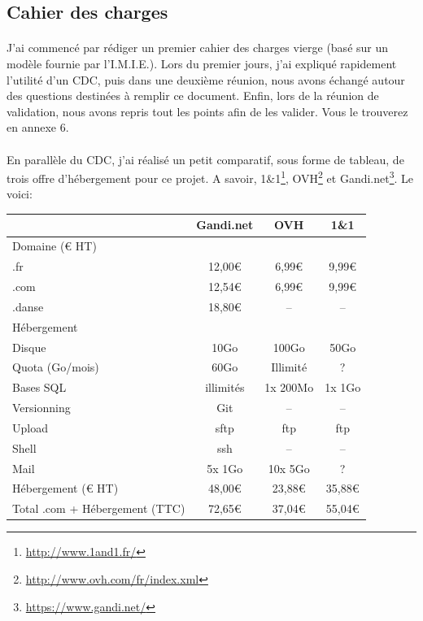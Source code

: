 \documentclass[11pt,a4paper,twoside]{report}
\begin{document}
		\subsection{Cahier des charges}
			\paragraph*{}J'ai commencé par rédiger un premier cahier des charges vierge (basé sur un modèle fournie par l'I.M.I.E.). Lors du premier jours, j'ai expliqué rapidement l'utilité d'un CDC, puis dans une deuxième réunion, nous avons échangé autour des questions destinées à remplir ce document. Enfin, lors de la réunion de validation, nous avons repris tout les points afin de les valider. Vous le trouverez en annexe 6.
			\paragraph*{}En parallèle du CDC, j'ai réalisé un petit comparatif, sous forme de tableau, de trois offre d'hébergement pour ce projet. A savoir, 1\&1\footnote{\url{http://www.1and1.fr/}}, OVH\footnote{\url{http://www.ovh.com/fr/index.xml}} et Gandi.net\footnote{\url{https://www.gandi.net/}}. Le voici:\\

				\begin{center}
					\begin{tabular}{|l|c|c|c|}
						\hline  & Gandi.net & OVH & 1\&1 \\ 
						\hline Domaine (\euro{} HT)\cellcolor[gray]{0.9} & \cellcolor[gray]{0.9} & \cellcolor[gray]{0.9} & \cellcolor[gray]{0.9} \\ 
						.fr & 12,00\euro{} & 6,99\euro{} & 9,99\euro{} \\ 
						.com & 12,54\euro{} & 6,99\euro{} & 9,99\euro{} \\ 
						.danse & 18,80\euro{} & -- & -- \\ 
						\hline Hébergement\cellcolor[gray]{0.9} & \cellcolor[gray]{0.9} & \cellcolor[gray]{0.9} & \cellcolor[gray]{0.9} \\ 
						Disque & 10Go & 100Go & 50Go \\ 
						Quota (Go/mois) & 60Go & Illimité & ? \\ 
						Bases SQL & illimités & 1x 200Mo & 1x 1Go \\
						Versionning  & Git & -- & -- \\ 
						Upload & sftp & ftp & ftp \\ 
						Shell & ssh & -- & -- \\ 
						Mail & 5x 1Go & 10x 5Go & ? \\ 
						Hébergement (\euro{} HT)\cellcolor[gray]{0.9} & 48,00\euro{}\cellcolor[gray]{0.9} & 23,88\euro{}\cellcolor[gray]{0.9} & 35,88\euro{}\cellcolor[gray]{0.9} \\ 
						Total .com + Hébergement (TTC)\cellcolor[gray]{0.7} & 72,65\euro{}\cellcolor[gray]{0.7} & 37,04\euro{}\cellcolor[gray]{0.7} & 55,04\euro{}\cellcolor[gray]{0.7} \\ 
						\hline 
					\end{tabular}
				\end{center}
\end{document}
